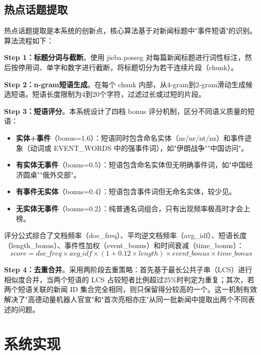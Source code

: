 \documentclass[UTF8,a4paper,zihao=5]{ctexart}
\begin{document}
\subsection{热点话题提取}

热点话题提取是本系统的创新点，核心算法基于对新闻标题中"事件短语"的识别。算法流程如下：

\textbf{Step 1：标题分词与截断}。使用 jieba.posseg 对每篇新闻标题进行词性标注，然后按停用词、单字和数字进行截断，将标题切分为若干连续片段（chunk）。

\textbf{Step 2：n-gram短语生成}。在每个 chunk 内部，从4-gram到2-gram滑动生成候选短语。短语长度限制为4到20个字符，过滤过长或过短的片段。

\textbf{Step 3：短语评分}。本系统设计了四档 bonus 评分机制，区分不同语义质量的短语：

\begin{itemize}
  \item \textbf{实体+事件}（bonus=1.6）：短语同时包含命名实体（ns/nr/nt/nz）和事件迹象（动词或 EVENT\_WORDS 中的强事件词），如"伊朗战争""中国访问"。
  \item \textbf{有实体无事件}（bonus=0.5）：短语包含命名实体但无明确事件词，如"中国经济圆桌""俄外交部"。
  \item \textbf{有事件无实体}（bonus=0.4）：短语包含事件词但无命名实体，较少见。
  \item \textbf{无实体无事件}（bonus=0.2）：纯普通名词组合，只有出现频率极高时才会上榜。
\end{itemize}

评分公式综合了文档频率（doc\_freq）、平均逆文档频率（avg\_idf）、短语长度（length\_bonus）、事件性加权（event\_bonus）和时间衰减（time\_bonus）：
\begin{equation}
  score = doc\_freq \times avg\_idf \times (1 + 0.12 \times length) \times event\_bonus \times time\_bonus
\end{equation}

\textbf{Step 4：去重合并}。采用两阶段去重策略：首先基于最长公共子串（LCS）进行相似度合并，当两个短语的 LCS 占较短者比例超过25\%时判定为重复；其次，若两个短语关联的新闻 ID 集合完全相同，则只保留得分较高的一个。这一机制有效解决了"高德动量机器人官宣"和"首次亮相亦庄"从同一批新闻中提取出两个不同表述的问题。

\section{系统实现}
\end{document}
